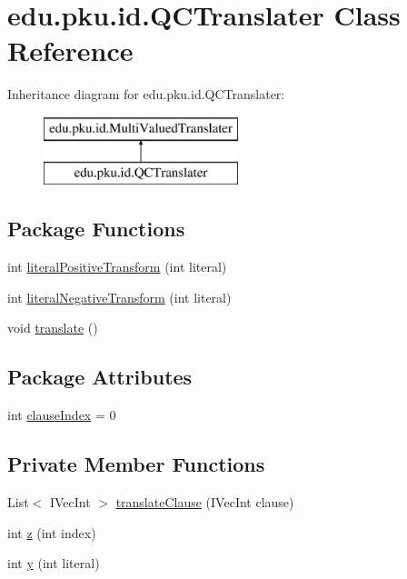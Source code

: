 \hypertarget{classedu_1_1pku_1_1id_1_1_q_c_translater}{
\section{edu.pku.id.QCTranslater Class Reference}
\label{classedu_1_1pku_1_1id_1_1_q_c_translater}
}
Inheritance diagram for edu.pku.id.QCTranslater:\begin{figure}[H]
\begin{center}
\leavevmode
\includegraphics[height=2.000000cm]{classedu_1_1pku_1_1id_1_1_q_c_translater}
\end{center}
\end{figure}
\subsection*{Package Functions}
\begin{DoxyCompactItemize}
\item 
int \hyperlink{classedu_1_1pku_1_1id_1_1_q_c_translater_aa8bd352645be8437d8feda2f04aff560}{literalPositiveTransform} (int literal)
\item 
int \hyperlink{classedu_1_1pku_1_1id_1_1_q_c_translater_a9439713e9f21664274a144214507c17b}{literalNegativeTransform} (int literal)
\item 
void \hyperlink{classedu_1_1pku_1_1id_1_1_q_c_translater_a2b3b851d0bcb6cbfc07badd6e6434096}{translate} ()
\end{DoxyCompactItemize}
\subsection*{Package Attributes}
\begin{DoxyCompactItemize}
\item 
int \hyperlink{classedu_1_1pku_1_1id_1_1_q_c_translater_ab609761f32dc4ff41071cd17a5152798}{clauseIndex} = 0
\end{DoxyCompactItemize}
\subsection*{Private Member Functions}
\begin{DoxyCompactItemize}
\item 
List$<$ IVecInt $>$ \hyperlink{classedu_1_1pku_1_1id_1_1_q_c_translater_ab5f9bf3cb3a91a4b74ca8a8580468305}{translateClause} (IVecInt clause)
\item 
int \hyperlink{classedu_1_1pku_1_1id_1_1_q_c_translater_a09e237ebaa40f125c9eefbab1a6a567e}{z} (int index)
\item 
int \hyperlink{classedu_1_1pku_1_1id_1_1_q_c_translater_a608a6c46bf90a6a1edb5fd832e4e0806}{y} (int literal)
\end{DoxyCompactItemize}


